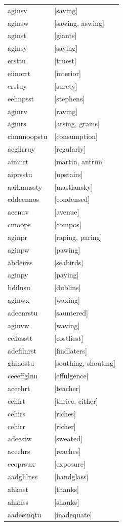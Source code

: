 \documentclass{article}
\begin{document}
\begin{tabular}{ll}
aginsv & [saving] \\
aginsw & [sawing, aswing] \\
aginst & [giants] \\
aginsy & [saying] \\
ersttu & [truest] \\
eiinorrt & [interior] \\
erstuy & [surety] \\
eehnpsst & [stephens] \\
aginrv & [raving] \\
aginrs & [arsing, grains] \\
cimnnoopstu & [consumption] \\
aegllrruy & [regularly] \\
aimnrt & [martin, antrim] \\
aiprsstu & [upstairs] \\
aaikmnssty & [mastiansky] \\
cddeennos & [condensed] \\
aeenuv & [avenue] \\
cmoops & [compos] \\
aginpr & [raping, paring] \\
aginpw & [pawing] \\
abdeirss & [seabirds] \\
aginpy & [paying] \\
bdilnsu & [dublins] \\
aginwx & [waxing] \\
adeenrstu & [sauntered] \\
aginvw & [waving] \\
ceilosstt & [costliest] \\
adefilnrst & [findlaters] \\
ghinostu & [southing, shouting] \\
ceeeffglnu & [effulgence] \\
aceehrt & [teacher] \\
cehirt & [thrice, cither] \\
cehirs & [riches] \\
cehirr & [richer] \\
adeestw & [sweated] \\
aceehrs & [reaches] \\
eeoprsux & [exposure] \\
aadghlnss & [handglass] \\
ahknst & [thanks] \\
ahknss & [shanks] \\
aadeeinqtu & [inadequate] \\

\end{tabular}
\end{document}
